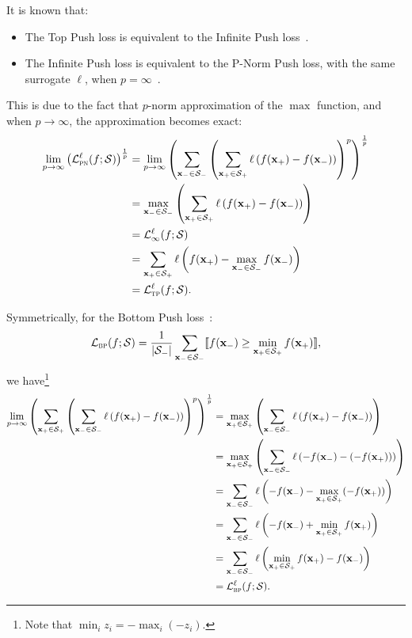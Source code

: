It is known that:
\begin{itemize}
\item The Top Push loss is equivalent to the Infinite Push loss~\cite{li2014top}.
\item The Infinite Push loss is equivalent to the P-Norm Push loss, with the same surrogate $\ell$,
      when $p = \infty$~\cite{agarwal2011infinite,rakotomamonjy2012sparse}.
\end{itemize}
This is due to the fact that $p$-norm approximation of the $\max$ function, and when $p \to \infty$,
the approximation becomes exact:
\begin{equation*}
\begin{aligned}
\lim_{p \to \infty} \left( \mathcal{L}_\textsc{pn}^\ell (f; \mathcal{S}) \right)^\frac{1}{p}
&= \lim_{p \to \infty} \left( \sum_{\mathbf{x}_- \in \mathcal{S}_-} \left( \sum_{\mathbf{x}_+ \in \mathcal{S}_+} 
   \ell \left( f(\mathbf{x}_+) - f(\mathbf{x}_-) \right) \right)^p \right)^\frac{1}{p} \\
&= \max_{\mathbf{x}_- \in \mathcal{S}_-} \left( \sum_{\mathbf{x}_+ \in \mathcal{S}_+} \ell \left( f(\mathbf{x}_+) - f(\mathbf{x}_-) \right) \right) \\
&= \mathcal{L}_\infty^\ell (f; \mathcal{S}) \\
&= \sum_{\mathbf{x}_+ \in \mathcal{S}_+} \ell \left( f(\mathbf{x}_+) - \max_{\mathbf{x}_- \in \mathcal{S}_-} f(\mathbf{x}_-) \right) \\
&= \mathcal{L}_\textsc{tp}^\ell (f; \mathcal{S}).
\end{aligned}
\end{equation*}

Symmetrically, for the Bottom Push loss~\cite{rudin2009p}:
\begin{equation*}
\mathcal{L}_\textsc{bp}(f; \mathcal{S})
= \frac{1}{|\mathcal{S}_-|} \sum_{\mathbf{x}_- \in \mathcal{S}_-} \llbracket f(\mathbf{x}_-) \ge \min_{\mathbf{x}_+ \in \mathcal{S}_+} f(\mathbf{x}_+) \rrbracket,
\end{equation*}
we have\footnote{Note that $\min_{i} z_i = -\max_i (-z_i)$.}
\begin{equation*}
\begin{aligned}
\lim_{p \to \infty} \left( \sum_{\mathbf{x}_+ \in \mathcal{S}_+} \left( \sum_{\mathbf{x}_- \in \mathcal{S}_-} 
   \ell \left( f(\mathbf{x}_+) - f(\mathbf{x}_-) \right) \right)^p \right)^\frac{1}{p}
&= \max_{\mathbf{x}_+ \in \mathcal{S}_+} \left( \sum_{\mathbf{x}_- \in \mathcal{S}_-} \ell \left( f(\mathbf{x}_+) - f(\mathbf{x}_-) \right) \right) \\
&= \max_{\mathbf{x}_+ \in \mathcal{S}_+} \left( \sum_{\mathbf{x}_- \in \mathcal{S}_-} \ell \left(-f(\mathbf{x}_-) - (-f(\mathbf{x}_+)) \right) \right) \\
&= \sum_{\mathbf{x}_- \in \mathcal{S}_-} \ell \left( -f(\mathbf{x}_-) - \max_{\mathbf{x}_+ \in \mathcal{S}_+} (-f(\mathbf{x}_+)) \right) \\
&= \sum_{\mathbf{x}_- \in \mathcal{S}_-} \ell \left( -f(\mathbf{x}_-) + \min_{\mathbf{x}_+ \in \mathcal{S}_+} f(\mathbf{x}_+) \right) \\
&= \sum_{\mathbf{x}_- \in \mathcal{S}_-} \ell \left(\min_{\mathbf{x}_+ \in \mathcal{S}_+} f(\mathbf{x}_+) - f(\mathbf{x}_-) \right) \\
&= \mathcal{L}_\textsc{bp}^\ell (f; \mathcal{S}).
\end{aligned}
\end{equation*}

